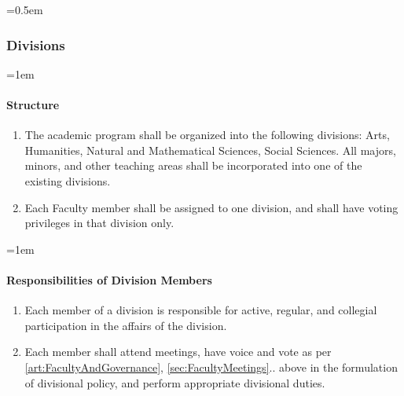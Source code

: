 \documentclass{manual}
\let\oldsubsubsection\subsubsection
\renewcommand\subsubsection{\leftskip=0.5em\oldsubsubsection}
\let\oldparagraph\paragraph
\renewcommand\paragraph{\leftskip=1em\oldparagraph}
\newcommand{\itemLevelA}{\alph*.}
\newcommand{\itemRefA}{\alph*}
\begin{document}
\subsubsection{Divisions}\label{sub:Divisions}

\paragraph{Structure}
\begin{enumerate}[label=\itemLevelA,ref=\itemRefA]

\item The academic program shall be organized into the following divisions: Arts, Humanities, Natural and Mathematical Sciences, Social Sciences. All majors, minors, and other teaching areas shall be incorporated into one of the existing divisions.

\item Each Faculty member shall be assigned to one division, and shall have voting privileges in that division only.
\end{enumerate}


\paragraph{Responsibilities of Division Members}
\begin{enumerate}[label=\itemLevelA,ref=\itemRefA]

\item Each member of a division is responsible for active, regular, and collegial participation in the affairs of the division.

\item Each member shall attend meetings, have voice and vote as per \cref{art:FacultyAndGovernance}, \cref{sec:FacultyMeetings}.. above in the formulation of divisional policy, and perform appropriate divisional duties.
\end{enumerate}
\end{document}

